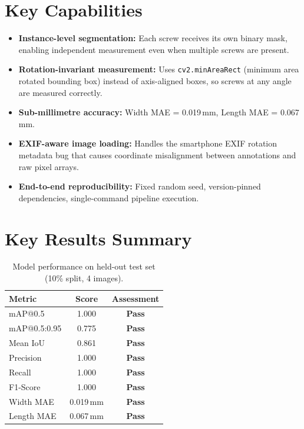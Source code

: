 \documentclass[12pt, a4paper, twoside]{report}
\begin{document}
\section{Key Capabilities}
\begin{itemize}
    \item \textbf{Instance-level segmentation:} Each screw receives its own binary mask, enabling independent measurement even when multiple screws are present.
    \item \textbf{Rotation-invariant measurement:} Uses \texttt{cv2.minAreaRect} (minimum area rotated bounding box) instead of axis-aligned boxes, so screws at any angle are measured correctly.
    \item \textbf{Sub-millimetre accuracy:} Width MAE = 0.019\,mm, Length MAE = 0.067\,mm.
    \item \textbf{EXIF-aware image loading:} Handles the smartphone EXIF rotation metadata bug that causes coordinate misalignment between annotations and raw pixel arrays.
    \item \textbf{End-to-end reproducibility:} Fixed random seed, version-pinned dependencies, single-command pipeline execution.
\end{itemize}

\section{Key Results Summary}
\begin{table}[H]
\centering
\caption{Model performance on held-out test set (10\% split, 4 images).}
\label{tab:key-results}
\begin{tabular}{lcc}
\toprule
\textbf{Metric} & \textbf{Score} & \textbf{Assessment} \\
\midrule
mAP@0.5                & 1.000   & \textcolor{passfg}{\textbf{Pass}} \\
mAP@0.5:0.95           & 0.775   & \textcolor{passfg}{\textbf{Pass}} \\
Mean IoU               & 0.861   & \textcolor{passfg}{\textbf{Pass}} \\
Precision              & 1.000   & \textcolor{passfg}{\textbf{Pass}} \\
Recall                 & 1.000   & \textcolor{passfg}{\textbf{Pass}} \\
F1-Score               & 1.000   & \textcolor{passfg}{\textbf{Pass}} \\
Width MAE              & 0.019\,mm & \textcolor{passfg}{\textbf{Pass}} \\
Length MAE             & 0.067\,mm & \textcolor{passfg}{\textbf{Pass}} \\
\bottomrule
\end{tabular}
\end{table}
\end{document}
